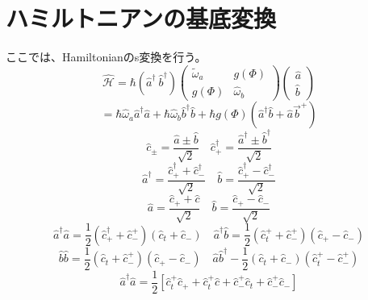 \section{ハミルトニアンの基底変換}
ここでは、Hamiltonianのs変換を行う。
\begin{equation}
    \hat{\mathcal{H}}=\hbar\left(\hat{a}^{\dagger }\ \hat{b}^{\dagger }\right)\left(\begin{array}{cc}
    \tilde{\omega}_{a} & g(\Phi ) \\
    g(\Phi ) & \hat{\omega}_{b}
    \end{array}\right)\left(\begin{array}{l}
    \hat{a} \\
    \hat{b}
    \end{array}\right)
\end{equation}
\begin{equation}
    = \hbar \hat{\omega}_{a} \hat{a}^{\dagger} \hat{a}+\hbar \hat{\omega}_{b} \hat{b}^{\dagger} \hat{b}+\hbar g(\Phi)\left(\hat{a}^{\dagger}\hat{b}+\hat{a} \vec{b}^{+}\right)
\end{equation}
\begin{equation}
    \hat{c}_{\pm}=\frac{\hat{a} \pm \hat{b}}{\sqrt{2}} \quad \hat{c}_{+}^{\dagger}=\frac{\hat{a}^{\dagger} \pm \hat{b}^{\dagger}}{\sqrt{2}}
\end{equation}
\begin{equation}
    \hat{a}^{\dagger}=\frac{\hat{c}_{+}^{\dagger}+\hat{c}_{-}^{\dagger}}{\sqrt{2}} \quad \hat{b}=\frac{\hat{c}_{+}^{\dagger}-\hat{c}_{-}^{\dagger}}{\sqrt{2}}
\end{equation}
\begin{equation}
    \hat{a}=\frac{\hat{c}_{+}+\hat{c}}{\sqrt{2}} \quad \hat{b}=\frac{\hat{c}_{+}-\hat{c}_{-}}{\sqrt{2}}
\end{equation}
\begin{equation}
    \hat{a}^{\dagger} \hat{a}=\frac{1}{2}\left(\hat{c}_{+}^{\dagger}+\hat{c}_{-}^{+}\right)\left(\hat{c}_{t}+\hat{c}_{-}\right) \quad \hat{a}^{\dagger} \hat{b}=\frac{1}{2}\left(\hat{c}_{t}^{+}+\hat{c}_{-}^{+}\right)\left(\hat{c}_{+}-\hat{c}_{-}\right)
\end{equation}
\begin{equation}
    \hat{b} \hat{b}=\frac{1}{2}\left(\hat{c}_{t}+\hat{c}_{-}^{+}\right)\left(\hat{c}_{+}-\hat{c}_{-}\right) \quad \hat{a} \hat{b}^{\dagger}-\frac{1}{2}\left(\hat{c}_{t}+\hat{c}_{-}\right)\left(\hat{c}_{t}^{+}-\hat{c}_{-}^{+}\right)
\end{equation}
\begin{equation}
    \hat{a}^{\dagger} \hat{a}=\frac{1}{2}\left[\hat{c}_{t}^{+} \hat{c}_{+}+\hat{c}_{t}^{+} \hat{c}+\hat{c}_{-}^{+} \hat{c}_{t}+\hat{c}_{-}^{+} \hat{c}_{-}\right]
\end{equation}
